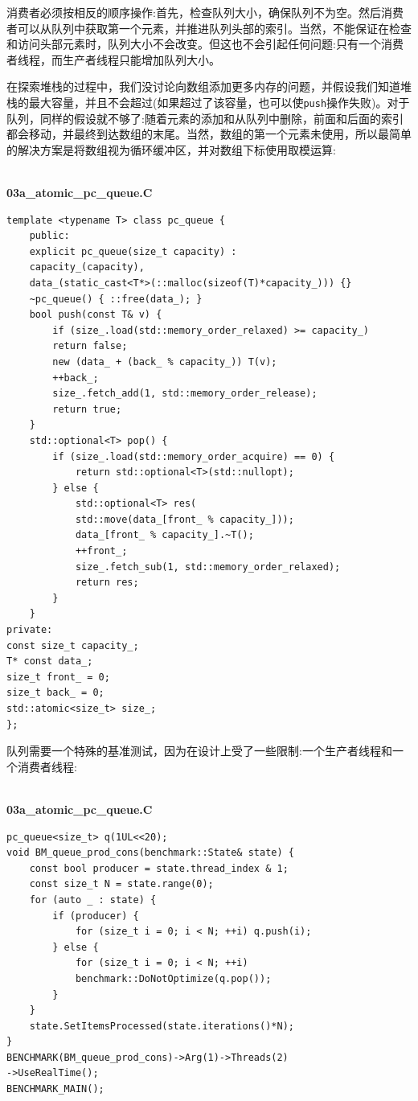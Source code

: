 消费者必须按相反的顺序操作:首先，检查队列大小，确保队列不为空。然后消费者可以从队列中获取第一个元素，并推进队列头部的索引。当然，不能保证在检查和访问头部元素时，队列大小不会改变。但这也不会引起任何问题:只有一个消费者线程，而生产者线程只能增加队列大小。

在探索堆栈的过程中，我们没讨论向数组添加更多内存的问题，并假设我们知道堆栈的最大容量，并且不会超过(如果超过了该容量，也可以使\texttt{push}操作失败)。对于队列，同样的假设就不够了:随着元素的添加和从队列中删除，前面和后面的索引都会移动，并最终到达数组的末尾。当然，数组的第一个元素未使用，所以最简单的解决方案是将数组视为循环缓冲区，并对数组下标使用取模运算:

\hspace*{\fill} \\ %
\noindent
\textbf{03a\_atomic\_pc\_queue.C}
\begin{lstlisting}[style=styleCXX]
template <typename T> class pc_queue {
	public:
	explicit pc_queue(size_t capacity) : 
	capacity_(capacity),
	data_(static_cast<T*>(::malloc(sizeof(T)*capacity_))) {}
	~pc_queue() { ::free(data_); }
	bool push(const T& v) {
		if (size_.load(std::memory_order_relaxed) >= capacity_)
		return false;
		new (data_ + (back_ % capacity_)) T(v);
		++back_;
		size_.fetch_add(1, std::memory_order_release);
		return true;
	}
	std::optional<T> pop() {
		if (size_.load(std::memory_order_acquire) == 0) {
			return std::optional<T>(std::nullopt);
		} else {
			std::optional<T> res(
			std::move(data_[front_ % capacity_]));
			data_[front_ % capacity_].~T();
			++front_;
			size_.fetch_sub(1, std::memory_order_relaxed);
			return res;
		}
	}
private:
const size_t capacity_;
T* const data_;
size_t front_ = 0;
size_t back_ = 0;
std::atomic<size_t> size_;
};
\end{lstlisting}

队列需要一个特殊的基准测试，因为在设计上受了一些限制:一个生产者线程和一个消费者线程:

\hspace*{\fill} \\ %
\noindent
\textbf{03a\_atomic\_pc\_queue.C}
\begin{lstlisting}[style=styleCXX]
pc_queue<size_t> q(1UL<<20);
void BM_queue_prod_cons(benchmark::State& state) {
	const bool producer = state.thread_index & 1;
	const size_t N = state.range(0);
	for (auto _ : state) {
		if (producer) {
			for (size_t i = 0; i < N; ++i) q.push(i);
		} else {
			for (size_t i = 0; i < N; ++i) 
			benchmark::DoNotOptimize(q.pop());
		}
	}
	state.SetItemsProcessed(state.iterations()*N);
}
BENCHMARK(BM_queue_prod_cons)->Arg(1)->Threads(2)
->UseRealTime();
BENCHMARK_MAIN();
\end{lstlisting}


